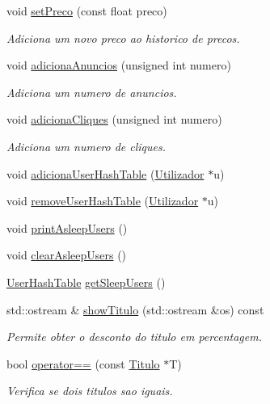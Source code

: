 \begin{DoxyCompactItemize}
void \mbox{\hyperlink{class_titulo_a08d0b556bebf6863edb62ed5dc19923c}{set\+Preco}} (const float preco)
\begin{DoxyCompactList}\small\item\em Adiciona um novo preco ao historico de precos. \end{DoxyCompactList}\item 
void \mbox{\hyperlink{class_titulo_a8004d12b8ae0d0746b999a6411df150c}{adiciona\+Anuncios}} (unsigned int numero)
\begin{DoxyCompactList}\small\item\em Adiciona um numero de anuncios. \end{DoxyCompactList}\item 
void \mbox{\hyperlink{class_titulo_a0cf99e4a2b522a7acae425593e87efec}{adiciona\+Cliques}} (unsigned int numero)
\begin{DoxyCompactList}\small\item\em Adiciona um numero de cliques. \end{DoxyCompactList}\item 
void \mbox{\hyperlink{class_titulo_a64300cd5c0c717f77666413127404d36}{adiciona\+User\+Hash\+Table}} (\mbox{\hyperlink{class_utilizador}{Utilizador}} $\ast$u)
\item 
void \mbox{\hyperlink{class_titulo_a66ee2ff7b95cf280a667dc87477a0ae1}{remove\+User\+Hash\+Table}} (\mbox{\hyperlink{class_utilizador}{Utilizador}} $\ast$u)
\item 
void \mbox{\hyperlink{class_titulo_ab14d7a11d5b91dec67fb115cfa83d860}{print\+Asleep\+Users}} ()
\item 
void \mbox{\hyperlink{class_titulo_aa3c77caaee860b214308cf0d2944b835}{clear\+Asleep\+Users}} ()
\item 
\mbox{\hyperlink{_titulo_8h_a0996281e9e5d419736dec228200cfdc5}{User\+Hash\+Table}} \mbox{\hyperlink{class_titulo_ae38bebc95efb3405d5cd9ca71aa98ab2}{get\+Sleep\+Users}} ()
\item 
std\+::ostream \& \mbox{\hyperlink{class_titulo_ab31e1d801062a75abdb10664de23d897}{show\+Titulo}} (std\+::ostream \&os) const
\begin{DoxyCompactList}\small\item\em Permite obter o desconto do titulo em percentagem. \end{DoxyCompactList}\item 
bool \mbox{\hyperlink{class_titulo_ac0622a3b256910ac87ee900a9be014b6}{operator==}} (const \mbox{\hyperlink{class_titulo}{Titulo}} $\ast$T)
\begin{DoxyCompactList}\small\item\em Verifica se dois titulos sao iguais. \end{DoxyCompactList}\end{DoxyCompactItemize}
